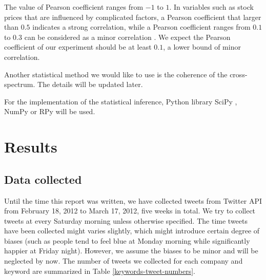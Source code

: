 \documentclass[12pt]{article}
\begin{document}
The value of Pearson coefficient ranges from $-1$ to $1$. In variables such as stock prices that are influenced by complicated factors, a Pearson coefficient that larger than $0.5$ indicates a strong correlation, while a Pearson coefficient ranges from $0.1$ to $0.3$ can be considered as a minor correlation \cite{Cohen:1988}. We expect the Pearson coefficient of our experiment should be at least $0.1$, a lower bound of minor correlation.

Another statistical method we would like to use is the coherence of the cross-spectrum. The details will be updated later.

For the implementation of the statistical inference, Python library SciPy \cite{SciPy}, NumPy \cite{NumPy} or RPy \cite{RPy} will be used.

\section{Results}

\subsection{Data collected}
Until the time this report was written, we have collected tweets from Twitter API from February 18, 2012 to March 17, 2012, five weeks in total. We try to collect tweets at every Saturday morning unless otherwise specified. The time tweets have been collected might varies slightly, which might introduce certain degree of biases (such as people tend to feel blue at Monday morning while significantly happier at Friday night). However, we assume the biases to be minor and will be neglected by now. The number of tweets we collected for each company and keyword are summarized in Table \ref{keywords-tweet-numbers}.
\end{document}
